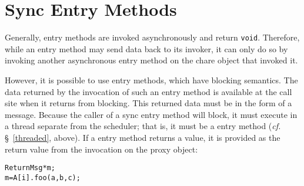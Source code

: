 
\section{Sync Entry Methods}
\label{sync}

Generally, entry methods are invoked asynchronously and return {\tt void}. Therefore,
while an entry method may send data back to its invoker, it can only do so by invoking
another asynchronous entry method on the chare object that invoked it.

However, it is possible to use  entry methods, which have blocking
semantics. The data returned by the invocation of such an entry method is
available at the call site when it returns from blocking. This returned data
must be in the form of a \charmpp message. Because the caller of a sync entry
method will block, it must execute in a thread separate from the scheduler;
that is, it must be a  entry method ({\em cf.} \S~\ref{threaded},
above).  If a  entry method returns a value, it is provided as the
return value from the invocation on the proxy object:

\begin{alltt}
 ReturnMsg* m;
 m = A[i].foo(a, b, c);
\end{alltt}
